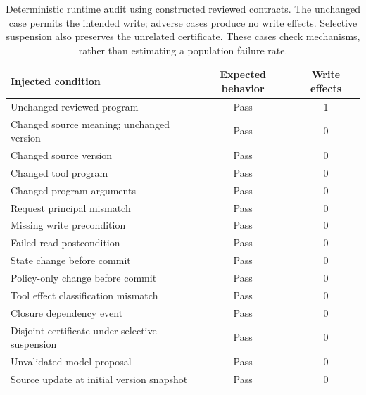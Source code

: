 \begin{table}[H]
\caption{Deterministic runtime audit using constructed reviewed contracts. The unchanged case permits the intended write; adverse cases produce no write effects. Selective suspension also preserves the unrelated certificate. These cases check mechanisms, rather than estimating a population failure rate.\label{tab:runtime-review}}
\centering\small\renewcommand{\arraystretch}{1.08}
\begin{tabular}{lcc}
\toprule
Injected condition & Expected behavior & Write effects \\
\midrule
Unchanged reviewed program & Pass & 1 \\
Changed source meaning; unchanged version & Pass & 0 \\
Changed source version & Pass & 0 \\
Changed tool program & Pass & 0 \\
Changed program arguments & Pass & 0 \\
Request principal mismatch & Pass & 0 \\
Missing write precondition & Pass & 0 \\
Failed read postcondition & Pass & 0 \\
State change before commit & Pass & 0 \\
Policy-only change before commit & Pass & 0 \\
Tool effect classification mismatch & Pass & 0 \\
Closure dependency event & Pass & 0 \\
Disjoint certificate under selective suspension & Pass & 0 \\
Unvalidated model proposal & Pass & 0 \\
Source update at initial version snapshot & Pass & 0 \\
\bottomrule
\end{tabular}
\end{table}
